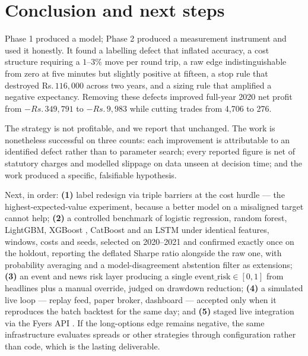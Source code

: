 \documentclass[10pt,a4paper]{article}
\newcommand{\rs}{Rs.\,}
\begin{document}
\section{Conclusion and next steps}\label{sec:next}

Phase 1 produced a model; Phase 2 produced a measurement instrument and used it
honestly. It found a labelling defect that inflated accuracy, a cost structure
requiring a $1$--$3\%$ move per round trip, a raw edge indistinguishable from
zero at five minutes but slightly positive at fifteen, a stop rule that
destroyed \rs$116{,}000$ across two years, and a sizing rule that amplified a
negative expectancy. Removing these defects improved full-year 2020 net profit
from $-\rs349{,}791$ to $-\rs9{,}983$ while cutting trades from 4{,}706 to 276.

The strategy is not profitable, and we report that unchanged. The work is
nonetheless successful on three counts: each improvement is attributable to an
identified defect rather than to parameter search; every reported figure is net
of statutory charges and modelled slippage on data unseen at decision time; and
the work produced a specific, falsifiable hypothesis.

Next, in order: \textbf{(1)} label redesign via triple barriers at the cost
hurdle --- the highest-expected-value experiment, because a better model on a
misaligned target cannot help; \textbf{(2)} a controlled benchmark of logistic
regression, random forest, LightGBM, XGBoost \cite{xgboost}, CatBoost
\cite{catboost} and an LSTM under identical features, windows, costs and seeds,
selected on 2020--2021 and confirmed exactly once on the holdout, reporting the
deflated Sharpe ratio alongside the raw one, with probability averaging and a
model-disagreement abstention filter as extensions; \textbf{(3)} an event and
news risk layer producing a single $\text{event\_risk}\in[0,1]$ from headlines
plus a manual override, judged on drawdown reduction; \textbf{(4)} a simulated
live loop --- replay feed, paper broker, dashboard --- accepted only when it
reproduces the batch backtest for the same day; and \textbf{(5)} staged live
integration via the Fyers API \cite{fyers}. If the long-options edge remains
negative, the same infrastructure evaluates spreads or other strategies through
configuration rather than code, which is the lasting deliverable.
\end{document}
